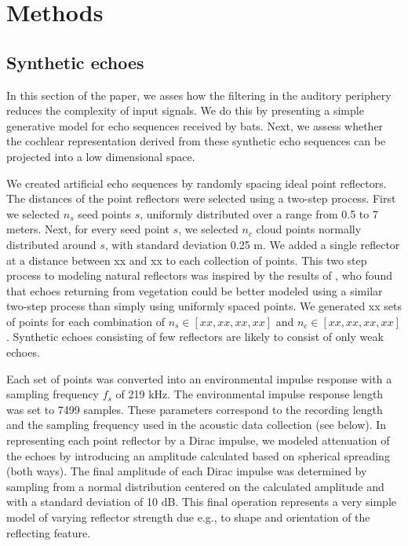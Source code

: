 \documentclass[preprint,5p]{elsarticle}
\begin{document}
\section{Methods}

\subsection{Synthetic echoes}

In this section of the paper, we asses how the filtering in the auditory periphery reduces the complexity of input signals. We do this by presenting a simple generative model for echo sequences received by bats. Next, we assess whether the cochlear representation derived from these synthetic echo sequences can be projected into a low dimensional space. 

We created artificial echo sequences by randomly spacing ideal point reflectors. The distances of the point reflectors were selected using a two-step process. First we selected $n_{s}$ seed points $s$, uniformly distributed over a range from 0.5 to 7 meters. Next, for every seed point $s$, we selected $n_{c}$ cloud points normally distributed around $s$, with standard deviation 0.25 m. We added a single reflector at a distance between xx and xx to each collection of points. This two step process to modeling natural reflectors was inspired by the results of \citet{Yovel2009}, who found that echoes returning from vegetation could be better modeled using a similar two-step process than simply using uniformly spaced points. We generated xx sets of points for each combination of $n_s \in [xx,xx,xx, xx]$ and $n_c \in [xx, xx, xx, xx]$. Synthetic echoes consisting of few reflectors are likely to consist of only weak echoes.

Each set of points was converted into an environmental impulse response with a sampling frequency $f_s$ of 219 kHz. The environmental impulse response length was set to 7499 samples. These parameters correspond to the recording length and the sampling frequency used in the acoustic data collection (see below). In representing each point reflector by a Dirac impulse, we modeled attenuation of the echoes by introducing an amplitude calculated based on spherical spreading (both ways). The final amplitude of each Dirac impulse was determined by sampling from a normal distribution centered on the calculated amplitude and with a standard deviation of 10 dB. This final operation represents a very simple model of varying reflector strength due e.g., to shape and orientation of the reflecting feature.
\end{document}

